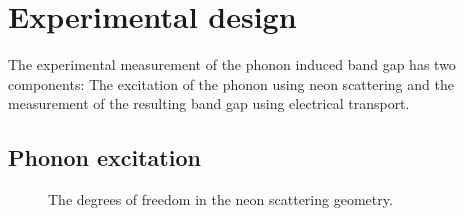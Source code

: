 \section{Experimental design}
The experimental measurement of the phonon induced band gap has two components: The excitation of the phonon using neon scattering and the measurement of the resulting band gap using electrical transport.

\subsection{Phonon excitation}

\begin{figure}
	\begin{center}
	
	\end{center}
	\caption[Neon scattering geometry]{
		The degrees of freedom in the neon scattering geometry.
	}
\end{figure}


